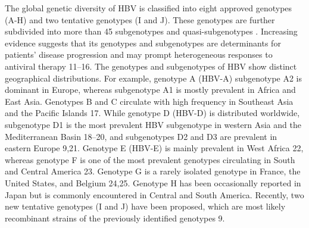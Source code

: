The global genetic diversity of HBV is classified into eight approved genotypes (A-H) and two tentative genotypes (I and J). These genotypes are further subdivided into more than 45 subgenotypes and quasi-subgenotypes \cite{pourkarim2014molecular,thijssen2020novel}. Increasing evidence suggests that its genotypes and subgenotypes are determinants for patients' disease progression and may prompt heterogeneous responses to antiviral therapy 11--16. The genotypes and subgenotypes of HBV show distinct geographical distributions. For example, genotype A (HBV-A) subgenotype A2 is dominant in Europe, whereas subgenotype A1 is mostly prevalent in Africa and East Asia. Genotypes B and C circulate with high frequency in Southeast Asia and the Pacific Islands 17. While genotype D (HBV-D) is distributed worldwide, subgenotype D1 is the most prevalent HBV subgenotype in western Asia and the Mediterranean Basin 18--20, and subgenotypes D2 and D3 are prevalent in eastern Europe 9,21. Genotype E (HBV-E) is mainly prevalent in West Africa 22, whereas genotype F is one of the most prevalent genotypes circulating in South and Central America 23. Genotype G is a rarely isolated genotype in France, the United States, and Belgium 24,25. Genotype H has been occasionally reported in Japan but is commonly encountered in Central and South America. Recently, two new tentative genotypes (I and J) have been proposed, which are most likely recombinant strains of the previously identified genotypes 9.\\

